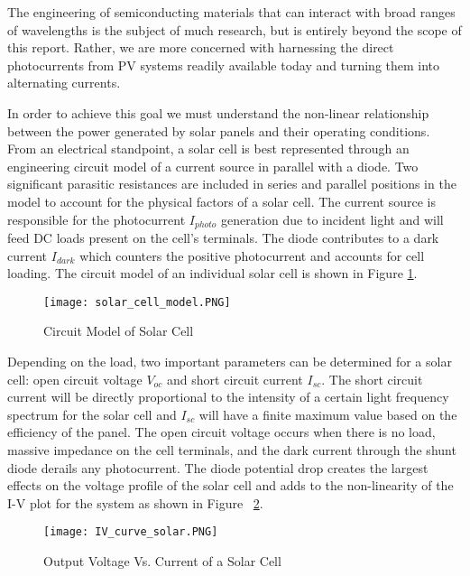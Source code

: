 The engineering of semiconducting materials that can interact with broad ranges of wavelengths is the subject of much research, but is entirely beyond the scope of this report. Rather, we are more concerned with harnessing the direct photocurrents from PV systems readily available today and turning them into alternating currents. 

In order to achieve this goal we must understand the non-linear relationship between the power generated by solar panels and their operating conditions. From an electrical standpoint, a solar cell is best represented through an engineering circuit model of a current source in parallel with a diode. Two significant parasitic resistances are included in series and parallel positions in the model to account for the physical factors of a solar cell. The current source is responsible for the photocurrent $I_{photo}$ generation due to incident light and will feed DC loads present on the cell's terminals. The diode contributes to a dark current $I_{dark}$ which counters the positive photocurrent and accounts for cell loading. The circuit model of an individual solar cell is shown in Figure \ref{circuitModel}. \cite{soteris}

\begin{figure}
\centering
\texttt{[image: solar\_cell\_model.PNG]}
\caption{Circuit Model of Solar Cell\cite{soteris}}
\label{circuitModel}
\end{figure}

Depending on the load, two important parameters can be determined for a solar cell: open circuit voltage $V_{oc}$ and short circuit current $I_{sc}$. The short circuit current will be directly proportional to the intensity of a certain light frequency spectrum for the solar cell and $I_{sc}$ will have a finite maximum value based on the efficiency of the panel. The open circuit voltage occurs when there is no load, massive impedance on the cell terminals, and the dark current through the shunt diode derails any photocurrent. The diode potential drop creates the largest effects on the voltage profile of the solar cell and adds to the non-linearity of the I-V plot for the system as shown in Figure ~\ref{Output Voltage Vs. Current of a Solar Cell}. \cite{soteris}

\begin{figure}
\centering
\texttt{[image: IV\_curve\_solar.PNG]}
\caption{Output Voltage Vs. Current of a Solar Cell\cite{soteris}}
\label{Output Voltage Vs. Current of a Solar Cell}
\end{figure}

